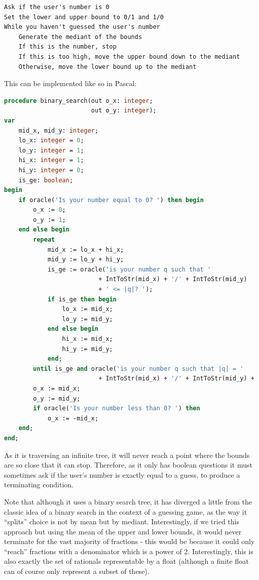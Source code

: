 \documentclass{article}
\begin{document}
\begin{lstlisting}[caption=Binary search on $\mathbb{Q}$ in pseudocode]
Ask if the user's number is 0
Set the lower and upper bound to 0/1 and 1/0
While you haven't guessed the user's number
    Generate the mediant of the bounds
    If this is the number, stop
    If this is too high, move the upper bound down to the mediant
    Otherwise, move the lower bound up to the mediant
\end{lstlisting}

    This can be implemented like so in Pascal:

\begin{lstlisting}[language=Pascal, caption=Binary search on $\mathbb{Q}$ in Pascal]
procedure binary_search(out o_x: integer;
                        out o_y: integer);
var
    mid_x, mid_y: integer;
    lo_x: integer = 0;
    lo_y: integer = 1;
    hi_x: integer = 1;
    hi_y: integer = 0;
    is_ge: boolean;
begin
    if oracle('Is your number equal to 0? ') then begin
        o_x := 0;
        o_y := 1;
    end else begin
        repeat
            mid_x := lo_x + hi_x;
            mid_y := lo_y + hi_y;
            is_ge := oracle('is your number q such that '
                          + IntToStr(mid_x) + '/' + IntToStr(mid_y)
                          + ' <= |q|? ');
            if is_ge then begin
                lo_x := mid_x;
                lo_y := mid_y;
            end else begin
                hi_x := mid_x;
                hi_y := mid_y;
            end;
        until is_ge and oracle('is your number q such that |q| = '
                          + IntToStr(mid_x) + '/' + IntToStr(mid_y) + '? ');
        o_x := mid_x;
        o_y := mid_y;
        if oracle('Is your number less than 0? ') then
            o_x := -mid_x;
    end;
end;
\end{lstlisting}

    As it is traversing an infinite tree, it will never reach a point where the
    bounds are so close that it can stop. Therefore, as it only has boolean
    questions it must sometimes ask if the user's number is exactly equal to a
    guess, to produce a terminating condition.

    Note that although it uses a binary search tree, it has diverged a little
    from the classic idea of a binary search in the context of a guessing game,
    as the way it ``splits'' choice is not by mean but by mediant.
    Interestingly, if we tried this approach but using the mean of the upper
    and lower bounds, it would never terminate for the vast majority of
    fractions - this would be because it could only ``reach'' fractions with a
    denominator which is a power of 2. Interestingly, this is also exactly the
    set of rationals representable by a float (although a finite float can of
    course only represent a subset of these).
    
\end{document}
